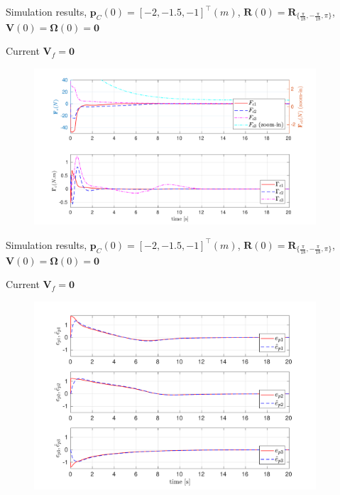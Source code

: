 \documentclass{beamer}
\begin{document}
\begin{frame}


\end{frame}


\begin{frame}{Simulation results, \tiny$\mathbf{p}_C(0) = [-2, -1.5, -1 ]^{\top} (m)$, $\mathbf{R}(0) = \mathbf{R}_{\{\frac{\pi}{18},-\frac{\pi}{18},\pi\}}$, $\mathbf{V}(0) = \mathbf{\Omega}(0) = \mathbf{0}$}

\begin{block}{Current $\mathbf{V}_f = \mathbf{0}$}
	\begin{figure}
		\includegraphics[width = 105mm]{Images/Data_sansCurrent_Fc_Gc2.pdf}
	\end{figure}
\end{block}
\end{frame}

\begin{frame}{Simulation results, \tiny$\mathbf{p}_C(0) = [-2, -1.5, -1 ]^{\top} (m)$, $\mathbf{R}(0) = \mathbf{R}_{\{\frac{\pi}{18},-\frac{\pi}{18},\pi\}}$, $\mathbf{V}(0) = \mathbf{\Omega}(0) = \mathbf{0}$}

\begin{block}{Current $\mathbf{V}_f = \mathbf{0}$}
	\begin{figure}
		\includegraphics[width = 105mm]{Images/Data_sansCurrent_ep_epHat2.pdf}
	\end{figure}
\end{block}
\end{frame}
\end{document}
